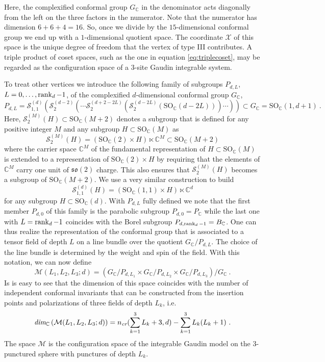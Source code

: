 \documentclass{article}
\def\bC{\mathbb{C}}
\begin{document}
Here, the complexified conformal group $G_\bC$ in the denominator acts diagonally 
from the left on the three factors in the numerator. Note that the numerator has 
dimension $6+6+4 = 16$. So, once we divide by the $15$-dimensional conformal group we 
end up with a $1$-dimensional quotient space. The coordinate $\mathcal{X}$ of 
this space is the unique degree of freedom that the vertex of type III 
contributes. A triple product of coset spaces, such as the one in equation 
\eqref{eq:triplecoset}, may be regarded as the configuration space of a 
$3$-site Gaudin integrable system. 

To treat other vertices we introduce the following family of subgroups 
$P_{d,L}$, $L = 0, \dots, \rank_d-1$, of the complexified $d$-dimensional 
conformal group $G_\bC$, 
\begin{equation} 
P_{d,L} = \mathcal{S}_{1,1}^{(d)}\left(\mathcal{S}_2^{(d-2)}\left(\cdots 
\mathcal{S}_2^{(d+2-2L)}\left(\mathcal{S}^{(d-2L)}_2(\mathrm{SO}_\bC(d-2L))
\right)\cdots \right) \right)  \subset G_\bC = \mathrm{SO}_\bC(1,d+1) \ .  
\end{equation} 
Here, $\mathcal{S}^{(M)}_2(H) \subset \mathrm{SO}_\bC(M+2)$ denotes a subgroup that is 
defined for any positive integer $M$ and any subgroup $H \subset \mathrm{SO}_\bC(M)$
as 
$$ \mathcal{S}^{(M)}_2 (H) = (\mathrm{SO}_\bC(2) \times H) \ltimes \mathbb{C}^M 
\subset \mathrm{SO}_\bC(M+2) $$
where the carrier space $\mathbb{C}^M$ of the fundamental representation 
of $H \subset \mathrm{SO}_\bC(M)$ is extended to a representation of 
$\mathrm{SO}_\bC(2) \times H$ by requiring that the elements of $\mathbb{C}^M$ carry one unit of $\mathfrak{so}(2)$ charge. This also ensures that 
$\mathcal{S}_2^{(M)}(H)$ becomes a subgroup of $\mathrm{SO}_\bC(M+2)$. We 
use a very similar construction to build 
$$ \mathcal{S}^{(d)}_{1,1}(H) = (\mathrm{SO}_\bC(1,1) \times H) \ltimes \mathbb{\bC}^d $$ 
for any subgroup $H \subset \mathrm{SO}_\bC(d)$. With $P_{d,L}$ fully defined we note 
that the first member $P_{d,0}$ of this family is the parabolic subgroup 
$P_{d,0} = P_\bC$ while the last one with $L = \rank_d-1$ coincides with the Borel 
subgroup $P_{d,\rank_d-1} = B_\bC$. One can thus realize the representation of the conformal group that is associated to a tensor field of depth $L$ on a line bundle over the quotient $G_\bC/P_{d,L}$. The choice of the line bundle is 
determined by the weight and spin of the field. With this notation, we can 
now define 
\begin{equation}
\mathcal{M}(L_1,L_2,L_3;d) = 
\left(G_\bC/P_{d,L_1} \times G_\bC/P_{d,L_2} \times G_\bC/P_{d,L_3}\right)/G_\bC\ .
\end{equation} 
Is is easy to see that the dimension of this space coincides with the number 
of independent conformal invariants that can be constructed from the insertion 
points and polarizations of three fields of depth $L_k$, i.e.\ 
\begin{equation}
 \textit{dim}_\bC\/ \left( \mathcal{M}(L_1,L_2,L_3;d) \right) = 
 n_\textit{cr}(\sum_{k=1}^3 L_{k}+3,d) - 
\sum_{k=1}^3 L_{k} (L_{k}+1)\ . 
\end{equation}
The space $\mathcal{M}$ is the configuration space of the integrable Gaudin 
model on the 3-punctured sphere with punctures of depth $L_k$.  
\end{document}
